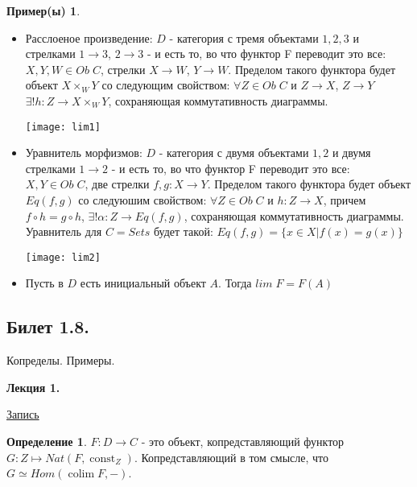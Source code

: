 \documentclass[a4paper]{article}
\newcommand{\mybox}{%
    \collectbox{%
        \setlength{\fboxsep}{1pt}%
        \fbox{\BOXCONTENT}%
    }%
}
\theoremstyle{indented}
\theoremstyle{definition}
\newtheorem{defn}{Определение}
\newtheorem{exl}{Пример(ы)}
\theoremstyle{remark}
\DeclareMathOperator{\ra}{\rightarrow}
\DeclareMathOperator{\const}{const}
\DeclareMathOperator{\colim}{colim}
\begin{document}
\begin{exl}
    \begin{itemize}
        \item Расслоеное произведение: $D$ - категория с тремя объектами $1, 2, 3$ и стрелками $1 \ra 3$, $2 \ra 3$ - и есть то, во что функтор F переводит это все: $X, Y, W \in Ob\;C$, стрелки $X \ra W$, $Y \ra W$. Пределом такого функтора будет объект $X \times_W Y$ со следующим свойством: $\forall Z \in Ob\;C$ и $Z \ra X$, $Z \ra Y$ $\exists !h: Z \ra X \times_W Y$, сохраняющая коммутативность диаграммы.
        \begin{center}\texttt{[image: lim1]}\end{center}
        \item Уравнитель морфизмов: $D$ - категория с двумя объектами $1, 2$ и двумя стрелками $1 \ra 2$ - и есть то, во что функтор F переводит это все: $X, Y \in Ob\;C$, две стрелки $f, g: X \ra Y$. Пределом такого функтора будет объект $Eq(f, g)$ со следуюшим свойством: $\forall Z \in Ob\;C$ и $h: Z \ra X$, причем $f \circ h = g \circ h$, $\exists !\alpha: Z \ra Eq(f, g)$, сохраняющая коммутативность диаграммы. \\
        Уравнитель для $C = Sets$ будет такой: $Eq(f, g) = \{x \in X | f(x) = g(x)\}$
        \begin{center}\texttt{[image: lim2]}\end{center}
        \item Пусть в $D$ есть инициальный объект $A$. Тогда $lim\;F = F(A)$
    \end{itemize}
\end{exl}



\newpage

\subsection{Билет 1.8.}

Копределы. Примеры. 

\hrulefill

\textbf{Лекция 1.} 

\begin{flushright}
    \mybox{
        \href{https://disk.yandex.ru/d/knoQ44wLmGDwwQ/2021-2022%20учебный%20год%20(осенний%20семестр)/2%20курс/Теоретическая%20информатика/Теор%20информатика%2C%20лекция%2C%2001.09.2021.mp4}{Запись}
    }
\end{flushright}

\begin{defn}
     $F: D \ra C$ - это объект, копредставляющий функтор $G: Z \mapsto Nat(F, \const_Z)$. Копредставляющий в том смысле, что $G \simeq Hom(\colim F, -)$.
\end{defn}
\end{document}
